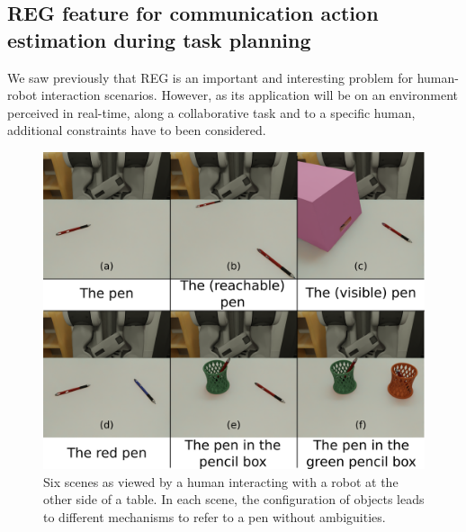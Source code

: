 \documentclass[a4paper,11pt,twoside]{StyleThese}
\begin{document}
\subsection{REG feature for communication action estimation during task planning}
We saw previously that REG is an important and interesting problem for human-robot interaction scenarios. However, as its application will be on an environment perceived in real-time, along a collaborative task and to a specific human, additional constraints have to been considered.

\begin{figure}[hbtp]
\centering
\includegraphics[width=\textwidth]{figures/chapter3/pens.png}
\caption{Six scenes as viewed by a human interacting with a robot at the other side of a table. In each scene, the configuration of objects leads to different mechanisms to refer to a pen without ambiguities.}
\label{fig:pens}
\end{figure}
\end{document}

